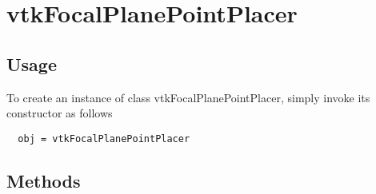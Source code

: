 \section{vtkFocalPlanePointPlacer}

\subsection{Usage}

 


To create an instance of class vtkFocalPlanePointPlacer, simply
invoke its constructor as follows
\begin{verbatim}
  obj = vtkFocalPlanePointPlacer
\end{verbatim}
\subsection{Methods}

